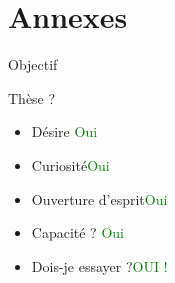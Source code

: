 \documentclass[hyperref={bookmarks=false},aspectratio=169]{beamer}
\begin{document}
\section{Annexes}

\begin{frame}{Objectif}
  
  \begin{block}{Thèse ?}
    \begin{itemize}
      \item Désire \dotfill \textcolor{Green}{Oui}
      \item Curiosité\dotfill\textcolor{Green}{Oui}
      \item Ouverture d'esprit\dotfill \textcolor{Green}{Oui}
      \item Capacité ? \dotfill \textcolor{Green}{Oui}
    \end{itemize}
    \begin{itemize}
      \item Dois-je essayer ?\dotfill \textcolor{Green}{OUI !}
    \end{itemize}
  \end{block}
\end{frame}
%
%
%
\end{document}
